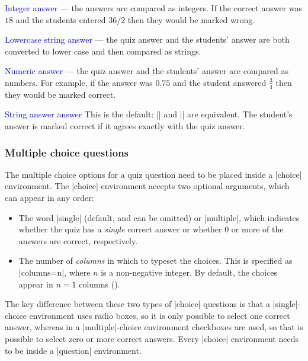 \documentclass[svgnames]{article}
\makeatletter
\newcommand\gobbleone[1]{}%
\newcommand\SeeIndex[2]{\index{#1!zzzz@\protect\gobbleone|See{#2}}}
\makeatother
\begin{document}
  \textcolor{blue}{Integer answer} --- the answers are compared as
  integers. If the correct answer was $18$ and the students entered
  $36/2$ then they would be marked wrong.

  \textcolor{blue}{Lowercase string answer} --- the quiz answer and the
  students' answer are both converted to lower case and then compared as
  strings.

  \textcolor{blue}{Numeric answer} --- the quiz answer and the students'
  answer are compared as numbers. For example, if the answer was $0.75$ and the student
  answered $\frac 34$ then they would be marked correct.

  \textcolor{blue}{String answer answer}
  This is the default: \LatexCode|| and
  \LatexCode|| are equivalent. The student's
  answer is marked correct if it agrees exactly with the quiz answer.

  \subsubsection{Multiple choice questions}
  \SeeIndex{multiple choice}{choice environment}

The multiple choice options for a quiz question need to be placed inside
a \LatexCode|choice| environment. The \LatexCode|choice| environment
accepts two optional arguments, which can appear in any order:
\begin{itemize}
  \item{}
  The word \LatexCode|single| (default, and can be omitted) or
  \LatexCode|multiple|, which indicates whether the quiz has a
  \textit{single} correct answer or whether 0 or more of the answers are
  correct, respectively.
  \item {}
  The number of \textit{columns} in which to typeset the choices. This
  is specified as \LatexCode|columns=n|, where $n$ is a non-negative integer.
  By default, the choices appear in $n=1$ columns
  ().
\end{itemize}
The key difference between these two types of \LatexCode|choice|
questions is that a \LatexCode|single|-choice environment uses radio
boxes, so it is only possible to select one correct answer, whereas in a
\LatexCode|multiple|-choice environment checkboxes are used, so that is
possible to select zero or more correct answers.  Every
\LatexCode|choice| environment needs to be inside a \LatexCode|question|
environment.
\end{document}
